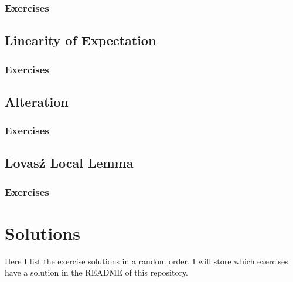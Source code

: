 \documentclass{article}
\begin{document}
\subsubsection*{Exercises}

\newpage

\subsection{Linearity of Expectation}

\subsubsection*{Exercises}

\newpage

\subsection{Alteration}

\subsubsection*{Exercises}

\newpage

\subsection{Lovas\'{z} Local Lemma}

\subsubsection*{Exercises}

\newpage

\section{Solutions}

Here I list the exercise solutions in a random order. I will store which exercises have a solution in the README of this repository. 
\end{document}
